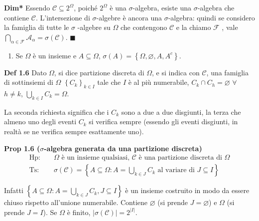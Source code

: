 \documentclass{article}
\begin{document}
\textbf{Dim*} Essendo $\mathcal{C}\subseteq 2^{\Omega }$, poich\'{e} $%
2^{\Omega }$ \`{e} una $\sigma $-algebra, esiste una $\sigma $-algebra che
contiene $\mathcal{C}$. L'intersezione di $\sigma $-algebre \`{e} ancora una 
$\sigma $-algebra: quindi se considero la famiglia di tutte le $\sigma $%
-algebre su $\Omega $ che contengono $\mathcal{C}$ e la chiamo $\mathcal{F}$%
, vale $\bigcap_{\alpha \in \mathcal{F}}\mathcal{A}_{\alpha }=\sigma \left( 
\mathcal{C}\right) $. $\blacksquare $

\begin{enumerate}
\item Se $\Omega $ \`{e} un insieme e $A\subseteq \Omega $, $\sigma \left(
A\right) =\left\{ \Omega ,\varnothing ,A,A^{c}\right\} $.
\end{enumerate}

\textbf{Def 1.6} Dato $\Omega $, si dice partizione discreta di $\Omega $, e
si indica con $\mathcal{C}$, una famiglia di sottinsiemi di $\Omega $ $%
\left\{ C_{k}\right\} _{k\in I}$ tale che $I$ \`{e} al pi\`{u} numerabile, $%
C_{k}\cap C_{h}=\varnothing $ $\forall $ $h\neq k$, $\bigcup_{k\in
I}C_{k}=\Omega $.

La seconda richiesta significa che i $C_{k}$ sono a due a due disgiunti, la
terza che almeno uno degli eventi $C_{k}$ si verifica sempre (essendo gli
eventi disgiunti, in realt\`{a} se ne verifica sempre esattamente uno).

\textbf{Prop 1.6 (}$\sigma $\textbf{-algebra generata da una partizione
discreta)} 
\begin{eqnarray*}
\text{Hp}\text{: } &&\Omega \text{ \`{e} un insieme qualsiasi, }\mathcal{C}%
\text{ \`{e} una partizione discreta di }\Omega \\
\text{Ts}\text{: } &&\sigma \left( \mathcal{C}\right) =\left\{ A\subseteq
\Omega :A=\bigcup_{k\in J}C_{k}\text{ al variare di }J\subseteq I\right\}
\end{eqnarray*}

Infatti $\left\{ A\subseteq \Omega :A=\bigcup_{k\in J}C_{k},J\subseteq
I\right\} $ \`{e} un insieme costruito in modo da essere chiuso rispetto
all'unione numerabile. Contiene $\varnothing $ (si prende $J=\varnothing $)
e $\Omega $ (si prende $J=I$). Se $\Omega $ \`{e} finito, $\left\vert \sigma
\left( \mathcal{C}\right) \right\vert =2^{\left\vert I\right\vert }$.
\end{document}
